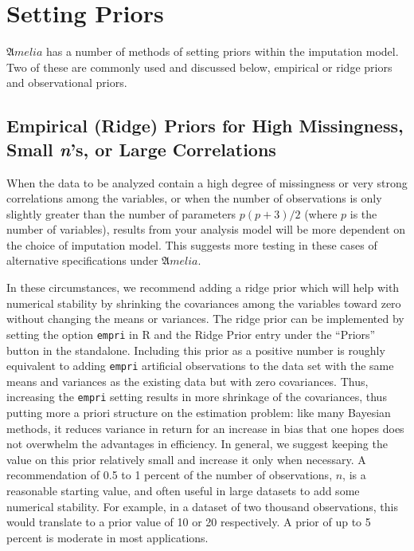 \documentclass[12pt,titlepage]{article}
\begin{document}
\section{Setting Priors} 

${\mathfrak Amelia}$ has a number of methods of setting priors within
the imputation model.  Two of these are commonly used and discussed
below, empirical or ridge priors and observational priors.

\subsection{Empirical (Ridge) Priors for High Missingness, 
  Small \emph{n}'s, or Large Correlations}\label{sec:prior}

When the data to be analyzed contain a high degree of missingness or
very strong correlations among the variables, or when the number of
observations is only slightly greater than the number of parameters
$p(p+3)/2$ (where $p$ is the number of variables), results from your
analysis model will be more dependent on the choice of imputation
model.  This suggests more testing in these cases of alternative
specifications under ${\mathfrak Amelia}$.

In these circumstances, we recommend adding a ridge prior which will
help with numerical stability by shrinking the covariances among the
variables toward zero without changing the means or variances.  The
ridge prior can be implemented by setting the option \texttt{empri} in
R and the Ridge Prior entry under the ``Priors'' button in the
standalone.  Including this prior as a positive number is roughly
equivalent to adding \texttt{empri} artificial observations to the
data set with the same means and variances as the existing data but
with zero covariances.  Thus, increasing the \texttt{empri} setting
results in more shrinkage of the covariances, thus putting more a
priori structure on the estimation problem: like many Bayesian
methods, it reduces variance in return for an increase in bias that
one hopes does not overwhelm the advantages in efficiency.  In
general, we suggest keeping the value on this prior relatively small
and increase it only when necessary.  A recommendation of 0.5 to 1
percent of the number of observations, $n$, is a reasonable starting
value, and often useful in large datasets to add some numerical
stability.  For example, in a dataset of two thousand observations,
this would translate to a prior value of 10 or 20 respectively.  A
prior of up to 5 percent is moderate in most applications.
\end{document}
